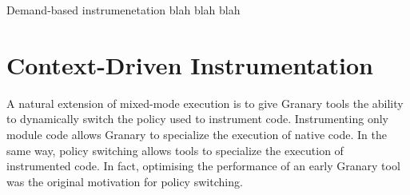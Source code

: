 \documentclass[preprint]{sigplanconf}
\begin{document}
Demand-based instrumenetation blah blah blah

%
%





\section{Context-Driven Instrumentation}\label{sec:policies}

A natural extension of mixed-mode execution is to give Granary tools the ability to dynamically switch the policy used to instrument code. Instrumenting only module code allows Granary to specialize the execution of native code. In the same way, policy switching allows tools to specialize the execution of instrumented code. In fact, optimising the performance of an early Granary tool was the original motivation for policy switching.
\end{document}
